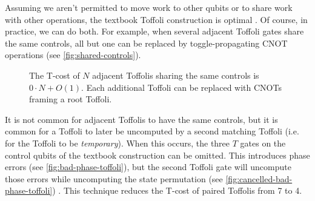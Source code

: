 \documentclass[twocolumn,longbibliography]{quantumarticle-customized}
\begin{document}
Assuming we aren't permitted to move work to other qubits or to share work with other operations, the textbook Toffoli construction is optimal \cite{Gosset2014}.
Of course, in practice, we can do both.
For example, when several adjacent Toffoli gates share the same controls, all but one can be replaced by toggle-propagating CNOT operations (see \autoref{fig:shared-controls}).

\begin{figure}
  \caption{
	The T-cost of $N$ adjacent Toffolis sharing the same controls is $0 \cdot N + O(1)$.
	Each additional Toffoli can be replaced with CNOTs framing a root Toffoli.
  }
  \label{fig:shared-controls}
\end{figure}

It is not common for adjacent Toffolis to have the same controls, but it is common for a Toffoli to later be uncomputed by a second matching Toffoli (i.e. for the Toffoli to be {\em temporary}).
When this occurs, the three $T$ gates on the control qubits of the textbook construction can be omitted.
This introduces phase errors (see \autoref{fig:bad-phase-toffoli}), but the second Toffoli gate will uncompute those errors while uncomputing the state permutation (see \autoref{fig:cancelled-bad-phase-toffoli}) \cite{Barenco1995}.
This technique reduces the T-cost of paired Toffolis from 7 to 4.
\end{document}
